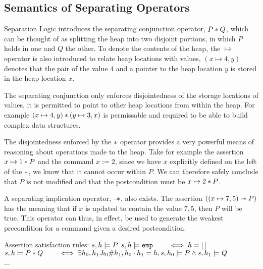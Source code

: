 \documentclass[a4paper]{report}
\begin{document}
  \subsection{Semantics of Separating Operators}
  
  Separation Logic introduces the separating conjunction operator, $P \mathbin{*} Q$,
  which can be thought of as splitting the heap into two disjoint portions, in
  which $P$ holds in one and $Q$ the other. To denote the contents of the
  heap, the $\mapsto$ operator is also introduced to relate heap locations with
  values, $(x \mapsto 4, y)$ denotes that the pair of the value $4$ and a pointer
  to the heap location $y$ is stored in the heap location $x$.

  The separating conjunction only enforces disjointedness of the storage
  locations of values, it is permitted to point to other heap locations from
  within the heap. For example $(x \mapsto 4, y) \mathbin{*} (y \mapsto 3, x)$ is
  permissable and required to be able to build complex data structures.


  The disjointedness enforced by the $\mathbin{*}$ operator provides a very powerful
  means of reasoning about operations made to the heap. Take for example the
  assertion $x \mapsto 1 \mathbin{*} P$ and the command $x := 2$, since we have $x$
  explicitly defined on the left of the $\mathbin{*}$, we know that it cannot occur
  within $P$. We can therefore safely conclude that $P$ is not modified and that
  the postcondition must be $x \mapsto 2 \mathbin{*} P$.

  A separating implication operator, $\mathbin{-\mkern-6mu *}$, also exists. The assertion $((x
  \mapsto 7, 5) \mathbin{-\mkern-6mu *} P)$ has the meaning that if $x$ is updated to contain the
  value $7, 5$, then $P$ will be true. This operator can thus, in effect, be
  used to generate the weakest precondition for a command given a desired
  postcondition.

  \begin{display}{Assertion satisfaction rules: $s,h \models P$}
    $s,h \models \texttt{emp} \qquad \iff h = [\,]$ \\
    $s,h \models P \mathbin{*} Q \qquad \iff \exists h_0, h_1.h_0 \# h_1, h_0 \cdot
    h_1 = h, s, h_0 \models P \land s,h_1 \models Q$ \\
    ...
  \end{display}
\end{document}
